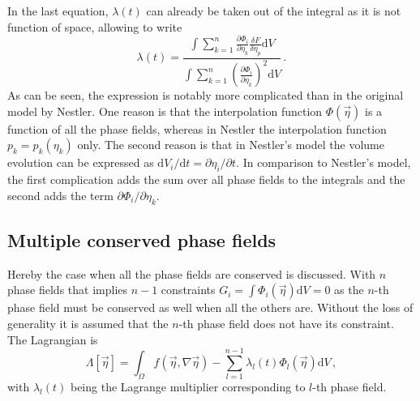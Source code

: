 In the last equation, $\lambda(t)$ can already be taken out of the integral as it is not function of space, allowing to write
\begin{equation}
	\lambda(t)=\frac{\int\sum_{k=1}^n \frac{\partial \Phi_i}{\partial \eta_k}\frac{\delta F}{\delta \eta_p} \mathrm{d}V}{\int\sum_{k=1}^n \left(\frac{\partial \Phi_i}{\partial \eta_k}\right)^2 \mathrm{d}V} \,.
\end{equation}
As can be seen, the expression is notably more complicated than in the original model by Nestler. One reason is that the interpolation function $\Phi(\vec{\eta})$ is a function of all the phase fields, whereas in Nestler the interpolation function $p_k=p_k(\eta_k)$ only.  The second reason is that in Nestler's model the volume evolution can be expressed as $\mathrm{d}V_i/\mathrm{d}t=\partial \eta_i/\partial t$. In comparison to Nestler's model, the first complication adds the sum over all phase fields to the integrals and the second adds the term $\partial \Phi_i/\partial \eta_k$.

\subsection{Multiple conserved phase fields}
Hereby the case when all the phase fields are conserved is discussed. With $n$ phase fields that implies $n-1$ constraints $G_{i}=\int \Phi_i(\vec{\eta})\mathrm{d}V=0$ as the $n$-th phase field must be conserved as well when all the others are. Without the loss of generality it is assumed that the $n$-th phase field does not have its constraint. The Lagrangian is 
\begin{equation}
	\Lambda[\vec{\eta}]= \int_\Omega f(\vec{\eta},\nabla\vec{\eta}) - \sum_{l=1}^{n-1}\lambda_l(t)\Phi_l(\vec{\eta}) \mathrm{d}V \,,
\end{equation}
with $\lambda_l(t)$ being the Lagrange multiplier corresponding to $l$-th phase field.

